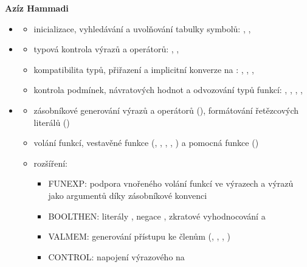 \documentclass[11pt,a4paper]{article}
\begin{document}
\textbf{Azíz Hammadi}

\begin{itemize}
  \item {}
  \begin{itemize}
    \item inicializace, vyhledávání a uvolňování tabulky symbolů: , , 
  \end{itemize}

  \item {}
  \begin{itemize}
    \item typová kontrola výrazů a operátorů: , , 
    \item kompatibilita typů, přiřazení a implicitní konverze  na : , , , 
    \item kontrola podmínek, návratových hodnot a odvozování typů funkcí: , , , , 
  \end{itemize}

  \item {}
  \begin{itemize}
    \item zásobníkové generování výrazů a operátorů (), formátování řetězcových literálů ()
    \item volání funkcí, vestavěné funkce (, , , , ) a pomocná funkce  ()
    \item rozšíření:
    \begin{itemize}
    \item FUNEXP: podpora vnořeného volání funkcí ve výrazech a výrazů jako argumentů díky zásobníkové konvenci 
      \item BOOLTHEN: literály , negace \id{!}, zkratové vyhodnocování \id{&&} a \id{||}
      \item VALMEM: generování přístupu ke členům (, , , )
      \item CONTROL: napojení výrazového  na 
    \end{itemize}
  \end{itemize}
\end{itemize}
\end{document}
